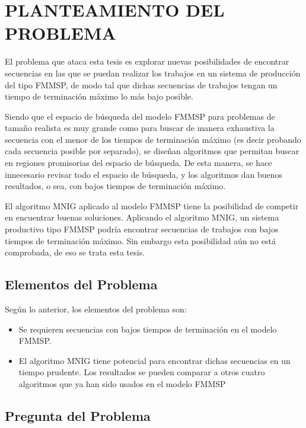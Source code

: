\documentclass{article}
\begin{document}
\section{PLANTEAMIENTO DEL PROBLEMA}

El problema que ataca esta tesis es explorar nuevas posibilidades de encontrar secuencias en las que se puedan realizar los trabajos en un sistema de producción del tipo FMMSP, de modo tal que dichas secuencias de trabajos tengan un tiempo de terminación máximo lo más bajo posible.

\vspace{\baselineskip}
Siendo que el espacio de búsqueda del modelo FMMSP para problemas de tamaño realista es muy grande como para buscar de manera exhaustiva la secuencia con el menor de los tiempos de terminación máximo (es decir probando cada secuencia posible por separado), se diseñan algoritmos que permitan buscar en regiones promisorias del espacio de búsqueda. De esta manera, se hace innecesario revisar todo el espacio de búsqueda, y los algoritmos dan buenos resultados, o sea, con bajos tiempos de terminación máximo.

\vspace{\baselineskip}
El algoritmo MNIG aplicado al modelo FMMSP tiene la posibilidad de competir en encuentrar buenas soluciones. Aplicando el algoritmo MNIG, un sistema productivo tipo FMMSP podría encontrar secuencias de trabajos con bajos tiempos de terminación máximo. Sin embargo esta posibilidad aún no está comprobada, de eso se trata esta tesis.

\subsection{Elementos del Problema}

Según lo anterior, los elementos del problema son:

\vspace{\baselineskip}
\begin{itemize}
    \item[\maltese] Se requieren secuencias con bajos tiempos de terminación en el modelo FMMSP.
    \item[\maltese] El algoritmo MNIG tiene potencial para encontrar dichas secuencias en un tiempo prudente. Los resultados se pueden comparar a otros cuatro algoritmos que ya han sido usados en el modelo FMMSP
\end{itemize}

\subsection{Pregunta del Problema}
\end{document}
